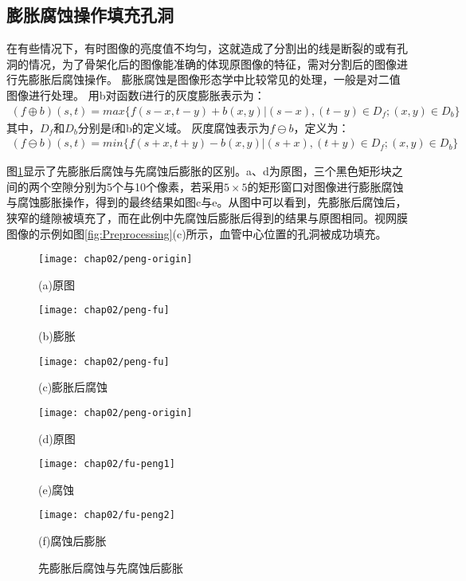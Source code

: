 \subsection{膨胀腐蚀操作填充孔洞}
在有些情况下，有时图像的亮度值不均匀，这就造成了分割出的线是断裂的或有孔洞的情况，为了骨架化后的图像能准确的体现原图像的特征，需对分割后的图像进行先膨胀后腐蚀操作。
膨胀腐蚀是图像形态学中比较常见的处理，一般是对二值图像进行处理。
用b对函数f进行的灰度膨胀\cite{gang}表示为：
\begin{align}
(f\oplus b)(s,t)=max\{f(s-x, t-y)+b(x,y)|(s-x),(t-y)\in D_f;(x,y)\in D_b\}
\end{align}
其中，$D_f$和$D_b$分别是f和b的定义域。
灰度腐蚀表示为$f \ominus b$，定义为：
\begin{align}
(f \ominus b)(s,t)=min\{f(s+x, t+y)-b(x,y)|(s+x),(t+y)\in D_f;(x,y)\in D_b\}
\end{align}

图\ref{fig:peng-fu}显示了先膨胀后腐蚀与先腐蚀后膨胀的区别。a、d为原图，三个黑色矩形块之间的两个空隙分别为5个与10个像素，若采用$5\times5$的矩形窗口对图像进行膨胀腐蚀与腐蚀膨胀操作，得到的最终结果如图c与e。从图中可以看到，先膨胀后腐蚀后，狭窄的缝隙被填充了，而在此例中先腐蚀后膨胀后得到的结果与原图相同。视网膜图像的示例如图\ref{fig:Preprocessing}(c)所示，血管中心位置的孔洞被成功填充。

\begin{figure}
\centering
  \begin{minipage}[b]{0.3\textwidth} 
      \centering 
      \texttt{[image: chap02/peng-origin]}
        \centerline{(a)原图}\medskip
    \end{minipage}
  \begin{minipage}[b]{0.3\textwidth}
    \centering
    \texttt{[image: chap02/peng-fu]}
      \centerline{(b)膨胀}\medskip
  \end{minipage}
  \begin{minipage}[b]{0.3\textwidth}
    \centering
    \texttt{[image: chap02/peng-fu]}
      \centerline{(c)膨胀后腐蚀}\medskip
  \end{minipage}
   \begin{minipage}[b]{0.3\textwidth} 
      \centering 
      \texttt{[image: chap02/peng-origin]}
        \centerline{(d)原图}\medskip
    \end{minipage}
  \begin{minipage}[b]{0.3\textwidth}
    \centering
    \texttt{[image: chap02/fu-peng1]}
      \centerline{(e)腐蚀}\medskip
  \end{minipage}
  \begin{minipage}[b]{0.3\textwidth}
    \centering
    \texttt{[image: chap02/fu-peng2]}
      \centerline{(f)腐蚀后膨胀}\medskip
  \end{minipage}
\caption{先膨胀后腐蚀与先腐蚀后膨胀}
\label{fig:peng-fu}
\end{figure}

